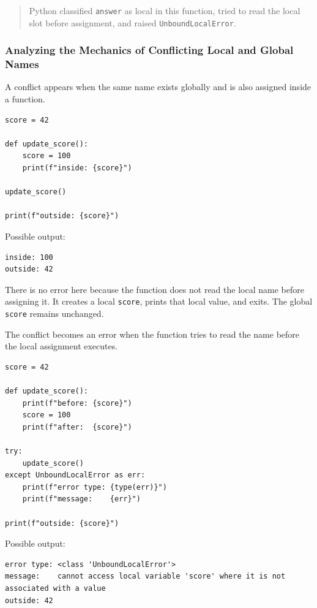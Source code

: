 \begin{quote}
Python classified \texttt{answer} as local in this function, tried to read the local slot before assignment, and raised \texttt{UnboundLocalError}.
\end{quote}

\subsubsection{Analyzing the Mechanics of Conflicting Local and Global Names}

A conflict appears when the same name exists globally and is also assigned inside a function.

\begin{verbatim}
score = 42

def update_score():
    score = 100
    print(f"inside: {score}")

update_score()

print(f"outside: {score}")
\end{verbatim}

Possible output:

\begin{verbatim}
inside: 100
outside: 42
\end{verbatim}

There is no error here because the function does not read the local name before assigning it. It creates a local \texttt{score}, prints that local value, and exits. The global \texttt{score} remains unchanged.

The conflict becomes an error when the function tries to read the name before the local assignment executes.

\begin{verbatim}
score = 42

def update_score():
    print(f"before: {score}")
    score = 100
    print(f"after:  {score}")

try:
    update_score()
except UnboundLocalError as err:
    print(f"error type: {type(err)}")
    print(f"message:    {err}")

print(f"outside: {score}")
\end{verbatim}

Possible output:

\begin{verbatim}
error type: <class 'UnboundLocalError'>
message:    cannot access local variable 'score' where it is not associated with a value
outside: 42
\end{verbatim}

